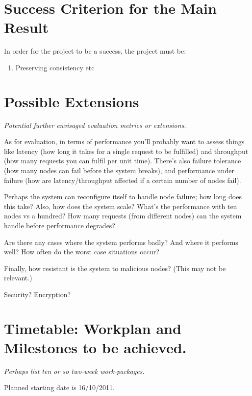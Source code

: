 \section*{Success Criterion for the Main Result}


In order for the project to be a success, the project must be:
\begin{enumerate}

\item Preserving consistency etc

\end{enumerate}




\section*{Possible Extensions}

{\em Potential further envisaged evaluation metrics or extensions.}

As for evaluation, in terms of performance you'll probably want to assess
things like latency (how long it takes for a single request to be fulfilled)
and throughput (how many requests you can fulfil per unit time). There's also
failure tolerance (how many nodes can fail before the system breaks), and
performance under failure (how are latency/throughput affected if a certain
number of nodes fail).

Perhaps the system can reconfigure itself to handle node failure; how long does
this take? Also, how does the system scale? What's the performance with ten
nodes vs a hundred? How many requests (from different nodes) can the system
handle before performance degrades?

Are there any cases where the system performs badly? And where it performs
well? How often do the worst case situations occur?

Finally, how resistant is the system to malicious nodes? (This may not be
relevant.)

Security? Encryption?

\section*{Timetable: Workplan and Milestones to be achieved.}


{\em Perhaps list ten or so  two-week work-packages.}

Planned starting date is 16/10/2011.

